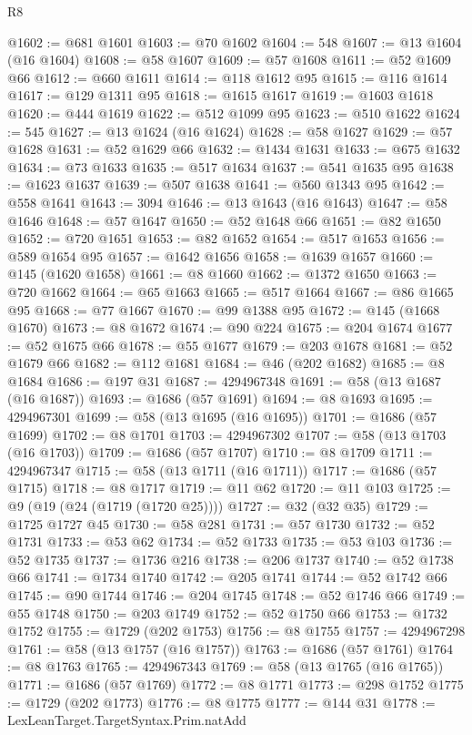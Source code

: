\begin{lexlean}{R8}
\begin{coremodule}
@1602 := @681 @1601
@1603 := @70 @1602
@1604 := 548
@1607 := @13 @1604 (@16 @1604)
@1608 := @58 @1607
@1609 := @57 @1608
@1611 := @52 @1609 @66
@1612 := @660 @1611
@1614 := @118 @1612 @95
@1615 := @116 @1614
@1617 := @129 @1311 @95
@1618 := @1615 @1617
@1619 := @1603 @1618
@1620 := @444 @1619
@1622 := @512 @1099 @95
@1623 := @510 @1622
@1624 := 545
@1627 := @13 @1624 (@16 @1624)
@1628 := @58 @1627
@1629 := @57 @1628
@1631 := @52 @1629 @66
@1632 := @1434 @1631
@1633 := @675 @1632
@1634 := @73 @1633
@1635 := @517 @1634
@1637 := @541 @1635 @95
@1638 := @1623 @1637
@1639 := @507 @1638
@1641 := @560 @1343 @95
@1642 := @558 @1641
@1643 := 3094
@1646 := @13 @1643 (@16 @1643)
@1647 := @58 @1646
@1648 := @57 @1647
@1650 := @52 @1648 @66
@1651 := @82 @1650
@1652 := @720 @1651
@1653 := @82 @1652
@1654 := @517 @1653
@1656 := @589 @1654 @95
@1657 := @1642 @1656
@1658 := @1639 @1657
@1660 := @145 (@1620 @1658)
@1661 := @8 @1660
@1662 := @1372 @1650
@1663 := @720 @1662
@1664 := @65 @1663
@1665 := @517 @1664
@1667 := @86 @1665 @95
@1668 := @77 @1667
@1670 := @99 @1388 @95
@1672 := @145 (@1668 @1670)
@1673 := @8 @1672
@1674 := @90 @224
@1675 := @204 @1674
@1677 := @52 @1675 @66
@1678 := @55 @1677
@1679 := @203 @1678
@1681 := @52 @1679 @66
@1682 := @112 @1681
@1684 := @46 (@202 @1682)
@1685 := @8 @1684
@1686 := @197 @31
@1687 := 4294967348
@1691 := @58 (@13 @1687 (@16 @1687))
@1693 := @1686 (@57 @1691)
@1694 := @8 @1693
@1695 := 4294967301
@1699 := @58 (@13 @1695 (@16 @1695))
@1701 := @1686 (@57 @1699)
@1702 := @8 @1701
@1703 := 4294967302
@1707 := @58 (@13 @1703 (@16 @1703))
@1709 := @1686 (@57 @1707)
@1710 := @8 @1709
@1711 := 4294967347
@1715 := @58 (@13 @1711 (@16 @1711))
@1717 := @1686 (@57 @1715)
@1718 := @8 @1717
@1719 := @11 @62
@1720 := @11 @103
@1725 := @9 (@19 (@24 (@1719 (@1720 @25))))
@1727 := @32 (@32 @35)
@1729 := @1725 @1727 @45
@1730 := @58 @281
@1731 := @57 @1730
@1732 := @52 @1731
@1733 := @53 @62
@1734 := @52 @1733
@1735 := @53 @103
@1736 := @52 @1735
@1737 := @1736 @216
@1738 := @206 @1737
@1740 := @52 @1738 @66
@1741 := @1734 @1740
@1742 := @205 @1741
@1744 := @52 @1742 @66
@1745 := @90 @1744
@1746 := @204 @1745
@1748 := @52 @1746 @66
@1749 := @55 @1748
@1750 := @203 @1749
@1752 := @52 @1750 @66
@1753 := @1732 @1752
@1755 := @1729 (@202 @1753)
@1756 := @8 @1755
@1757 := 4294967298
@1761 := @58 (@13 @1757 (@16 @1757))
@1763 := @1686 (@57 @1761)
@1764 := @8 @1763
@1765 := 4294967343
@1769 := @58 (@13 @1765 (@16 @1765))
@1771 := @1686 (@57 @1769)
@1772 := @8 @1771
@1773 := @298 @1752
@1775 := @1729 (@202 @1773)
@1776 := @8 @1775
@1777 := @144 @31
@1778 := LexLeanTarget.TargetSyntax.Prim.natAdd

\end{coremodule}
\end{lexlean}
